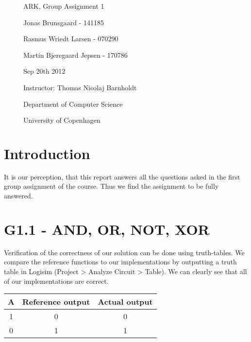 \documentclass[11pt,a4paper]{article}
\begin{document}
\begin{figure}
  \thispagestyle{empty}
  \centering
    \vspace*{0.5cm}
    {\Huge ARK, Group Assignment 1 \par
    }\par
    \par
    \vspace*{0.4cm}
    \large Jonas Brunsgaard - 141185 \par
        Rasmus Wriedt Larsen - 070290 \par
        Martin Bjeregaard Jepsen - 170786 \par
    \vspace*{0.4cm}
    Sep 20th 2012 \par
    \vspace*{0.4cm}
    \small Instructor: Thomas Nicolaj Barnholdt \par
    \vspace*{0.4cm}
    \small Department of Computer Science \par
    \small University of Copenhagen \par
\end{figure}
\clearpage
\thispagestyle{plain}

\section*{Introduction}
It is our perception, that this report answers all the questions asked in the
first group assignment of the course. Thus we find the assignment to be fully
answered.

\section*{G1.1 - AND, OR, NOT, XOR}

Verification of the correctness of our solution can be done using truth-tables. We compare the reference
functions to our implementations by outputting a truth table in Logisim (Project > Analyze Circuit > Table).
We can clearly see that all of our implementations are correct.

\begin{table}
    \begin{tabular}{c || c || c}
    A & Reference output & Actual output \\ \hline
    1 & 0                & 0             \\
    0 & 1                & 1             \\
    \end{tabular}
\end{table}
\end{document}
